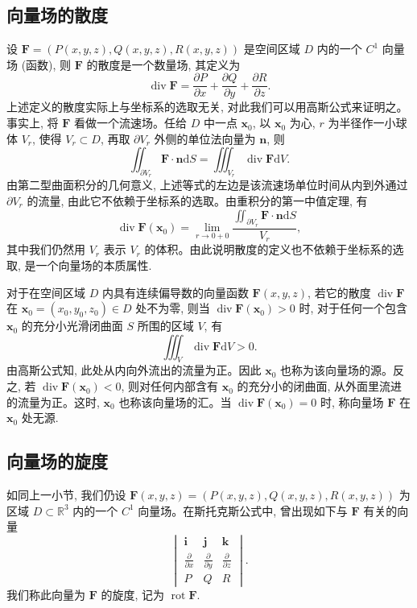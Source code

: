\subsection{向量场的散度}
\label{subsec:ma-16-8-3}

设 $\boldsymbol F=(P(x,y,z),Q(x,y,z),R(x,y,z))$ 是空间区域 $D$ 内的一个 $C^1$ 向量场 (函数), 则 $\boldsymbol F$ 的散度是一个数量场, 其定义为
\[
  \operatorname{div}\boldsymbol F=
  \frac{\partial P}{\partial x}+\frac{\partial Q}{\partial y}+\frac{\partial R}{\partial z}.
\]
上述定义的散度实际上与坐标系的选取无关, 对此我们可以用高斯公式来证明之。事实上, 将 $\boldsymbol F$ 看做一个流速场。任给 $D$ 中一点 $\boldsymbol x_0$, 以 $\boldsymbol x_0$ 为心, $r$ 为半径作一小球体 $V_r$, 使得 $V_r\subset D$, 再取 $\partial V_r$ 外侧的单位法向量为 $\boldsymbol n$, 则
\[
  \iint_{\partial V_r}\boldsymbol F\cdot\boldsymbol n\mathrm dS
  =
  \iiint_{V_r}\operatorname{div}\boldsymbol F\mathrm dV.
\]
由第二型曲面积分的几何意义, 上述等式的左边是该流速场单位时间从内到外通过 $\partial V_r$ 的流量, 由此它不依赖于坐标系的选取。由重积分的第一中值定理, 有
\[
  \operatorname{div}\boldsymbol F(\boldsymbol x_0)
  =
  \lim_{r\to0+0}
  \frac{\iint_{\partial V_r}\boldsymbol F\cdot\boldsymbol n\mathrm dS}{V_r},
\]
其中我们仍然用 $V_r$ 表示 $V_r$ 的体积。由此说明散度的定义也不依赖于坐标系的选取, 是一个向量场的本质属性.

对于在空间区域 $D$ 内具有连续偏导数的向量函数 $\boldsymbol F(x,y,z)$, 若它的散度 $\operatorname{div}\boldsymbol F$ 在 $\boldsymbol x_0=(x_0,y_0,z_0)\in D$ 处不为零, 则当 $\operatorname{div}\boldsymbol F(\boldsymbol x_0)>0$ 时, 对于任何一个包含 $\boldsymbol x_0$ 的充分小光滑闭曲面 $S$ 所围的区域 $V$, 有
\[
  \iiint_V\operatorname{div}\boldsymbol F\mathrm dV>0.
\]
由高斯公式知, 此处从内向外流出的流量为正。因此 $\boldsymbol x_0$ 也称为该向量场的源。反之, 若 $\operatorname{div}\boldsymbol F(\boldsymbol x_0)<0$, 则对任何内部含有 $\boldsymbol x_0$ 的充分小的闭曲面, 从外面里流进的流量为正。这时, $\boldsymbol x_0$ 也称该向量场的汇。当 $\operatorname{div}\boldsymbol F(\boldsymbol x_0)=0$ 时, 称向量场 $\boldsymbol F$ 在 $\boldsymbol x_0$ 处无源.

\subsection{向量场的旋度}
\label{subsec:ma-16-8-4}

如同上一小节, 我们仍设 $\boldsymbol F(x,y,z)=(P(x,y,z),Q(x,y,z),R(x,y,z))$ 为区域 $D\subset\mathbb R^3$ 内的一个 $C^1$ 向量场。在斯托克斯公式中, 曾出现如下与 $\boldsymbol F$ 有关的向量
\[
  \begin{vmatrix}
    \boldsymbol i&\boldsymbol j&\boldsymbol k\\
    \frac{\partial}{\partial x}&\frac{\partial}{\partial y}&\frac{\partial}{\partial z}\\
    P&Q&R
  \end{vmatrix}.
\]
我们称此向量为 $\boldsymbol F$ 的旋度, 记为 $\operatorname{rot}\boldsymbol F$.

